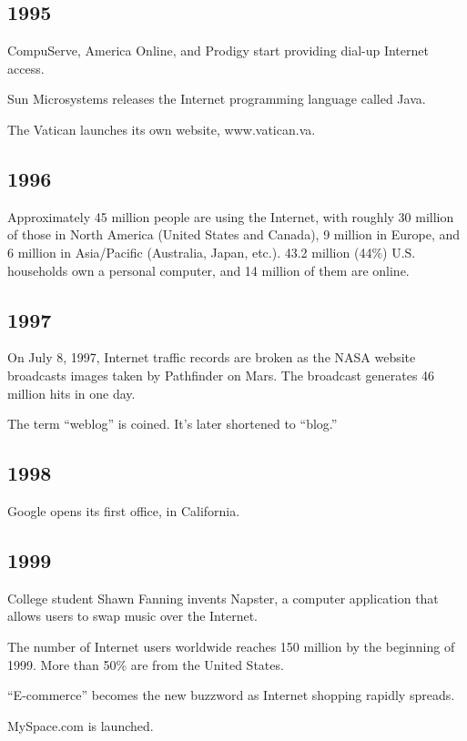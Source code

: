 \documentclass[letterpaper,12pt,english]{sphinxmanual}
\begin{document}
\subsection{1995}
\label{network-timeline:id14}
CompuServe, America Online, and Prodigy start providing dial-up Internet access.

Sun Microsystems releases the Internet programming language called Java.

The Vatican launches its own website, www.vatican.va.


\subsection{1996}
\label{network-timeline:id15}
Approximately 45 million people are using the Internet, with roughly 30 million of those in North America (United States and Canada), 9 million in Europe, and 6 million in Asia/Pacific (Australia, Japan, etc.). 43.2 million (44\%) U.S. households own a personal computer, and 14 million of them are online.


\subsection{1997}
\label{network-timeline:id16}
On July 8, 1997, Internet traffic records are broken as the NASA website broadcasts images taken by Pathfinder on Mars. The broadcast generates 46 million hits in one day.

The term “weblog” is coined. It’s later shortened to “blog.”


\subsection{1998}
\label{network-timeline:id17}
Google opens its first office, in California.


\subsection{1999}
\label{network-timeline:id18}
College student Shawn Fanning invents Napster, a computer application that allows users to swap music over the Internet.

The number of Internet users worldwide reaches 150 million by the beginning of 1999. More than 50\% are from the United States.

“E-commerce” becomes the new buzzword as Internet shopping rapidly spreads.

MySpace.com is launched.
\end{document}
